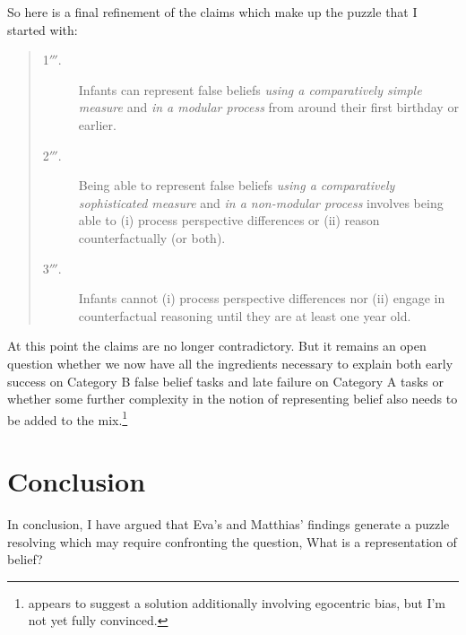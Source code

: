 \documentclass[12pt,\papersize]{extarticle}
\begin{document}
So here is a final refinement of the claims which make up the puzzle that I started with:
%
\begin{quote}
\begin{description}
\item[1$'''$.] Infants can represent false beliefs \emph{using a comparatively simple measure} and \emph{in a modular process} from around their first birthday or earlier.
%
\item[2$'''$.] Being able to represent false beliefs \emph{using a comparatively sophisticated measure} and  \emph{in a non-modular process}  involves being able to  (i) process perspective differences or (ii) reason counterfactually (or both). 
%
\item[3$'''$.] Infants cannot (i) process perspective differences nor (ii) engage in counterfactual reasoning until they are at least one year old.  
\end{description}
\end{quote}
%
At this point the claims are no longer contradictory.
But it remains an open question whether we now have all the ingredients necessary to explain both early success on Category B false belief tasks and late failure on Category A tasks or whether  some further complexity in the notion of representing belief also needs to be added to the mix.\footnote{
\citet[p.\ 155-6]{Apperly:2010kx} appears to suggest a solution additionally involving egocentric bias, but I'm not yet fully convinced.
}



\section{Conclusion}
In conclusion,
I have argued that  Eva's and Matthias' findings generate a puzzle  resolving which may require confronting the question, What is a representation of belief?














\end{document}
